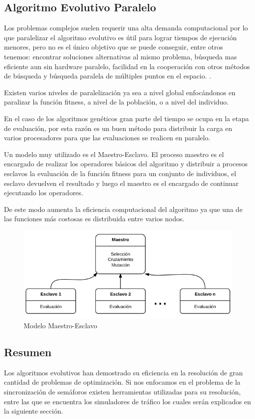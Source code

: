 \subsection{Algoritmo Evolutivo Paralelo}
Los problemas complejos suelen requerir una alta demanda computacional por lo que paralelizar el algoritmo evolutivo es útil para lograr tiempos de ejecución menores, pero no es el único objetivo que se puede conseguir, entre otros tenemos:  encontrar soluciones alternativas al mismo problema, búsqueda mas eficiente aun sin hardware paralelo, facilidad en la cooperación con otros métodos de búsqueda y búsqueda paralela de múltiples puntos en el espacio. \citep{Alba2002}. 


Existen varios niveles de paralelización ya sea a nivel global enfocándonos en paralizar la función fitness, a nivel de la población, o a nivel del individuo. \citep{Nesmachnow2002}

En el caso de los algoritmos genéticos gran parte del tiempo se ocupa en la etapa de evaluación, por esta razón es un buen método para distribuir la carga en varios procesadores para que las evaluaciones se realicen en paralelo. 

Un modelo muy utilizado es el Maestro-Esclavo. El proceso maestro es el encargado de realizar los operadores básicos del algoritmo y distribuir a procesos esclavos la evaluación de la función fitness para un conjunto de individuos, el esclavo devuelven el resultado y luego el maestro es el encargado de continuar ejecutando los operadores.

De este modo aumenta la eficiencia computacional del algoritmo ya que una de las funciones más costosas es distribuida entre varios nodos.

\begin{figure}[H]
	\centering
	\includegraphics[width=0.7\linewidth]{Figures/diagrama-master-slave}
	\caption[Modelo Maestro-Esclavo]{Modelo Maestro-Esclavo}
	\label{fig:diagrama-master-slave}
\end{figure}

\subsection{Resumen}
Los algoritmos evolutivos han demostrado su eficiencia en la resolución de gran cantidad de problemas de optimización.  Si nos enfocamos en el problema de la sincronización de semáforos existen herramientas utilizadas para su resolución, entre las que se encuentra los simuladores de tráfico los cuales serán explicados en la siguiente sección.


